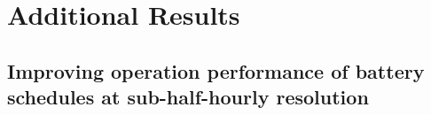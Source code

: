 \chapter{Additional Results}
\label{appx-a:additional-results}

\section{Improving operation performance of battery schedules at sub-half-hourly resolution}
\label{appx-a:ch1}


\newpage


\newpage


\newpage